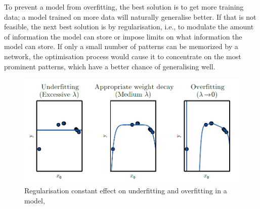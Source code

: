 \documentclass[12pt]{report}
\numberwithin{equation}{section}
\begin{document}
To prevent a model from overfitting, the best solution is to get more training data; a model trained on more data will naturally generalise better. If that is not feasible, the next best solution is by regularisation, i.e., to modulate the amount of information the model can store or impose limits on what information the model can store. If only a small number of patterns can be memorized by a network, the optimisation process would cause it to concentrate on the most prominent patterns, which have a better chance of generalising well.
\begin{figure}[htb]
\centering
\includegraphics[scale=0.8]{png/lambda.png} 
\caption[Regularisation constant effect on underfitting and overfitting in a model]{Regularisation constant effect on underfitting and overfitting in a model, \protect\textbf{\cite{10.5555/3086952}}}
\label{fig:lambda}
\end{figure}
\end{document}
